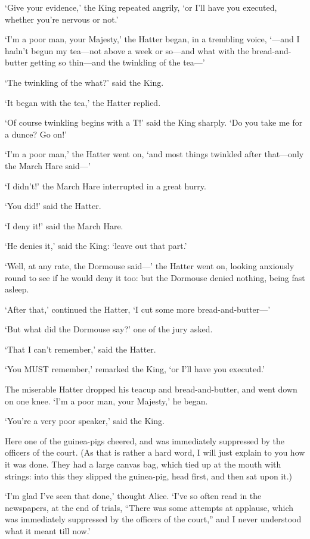 \documentclass[12pt]{book}
\begin{document}
\begin{Parallel}[p]{}{}
{‘Give your evidence,’ the King repeated angrily, ‘or I’ll have you executed, whether you’re nervous or not.’

‘I’m a poor man, your Majesty,’ the Hatter began, in a trembling voice, ‘—and I hadn’t begun my tea—not above a week or so—and what with the bread-and-butter getting so thin—and the twinkling of the tea—’

‘The twinkling of the what?’ said the King.

‘It began with the tea,’ the Hatter replied.

‘Of course twinkling begins with a T!’ said the King sharply. ‘Do you take me for a dunce? Go on!’

‘I’m a poor man,’ the Hatter went on, ‘and most things twinkled after that—only the March Hare said—’

‘I didn’t!’ the March Hare interrupted in a great hurry.

‘You did!’ said the Hatter.

‘I deny it!’ said the March Hare.

‘He denies it,’ said the King: ‘leave out that part.’

‘Well, at any rate, the Dormouse said—’ the Hatter went on, looking anxiously round to see if he would deny it too: but the Dormouse denied nothing, being fast asleep.

‘After that,’ continued the Hatter, ‘I cut some more bread-and-butter—’

‘But what did the Dormouse say?’ one of the jury asked.

‘That I can’t remember,’ said the Hatter.

‘You MUST remember,’ remarked the King, ‘or I’ll have you executed.’

The miserable Hatter dropped his teacup and bread-and-butter, and went down on one knee. ‘I’m a poor man, your Majesty,’ he began.

‘You’re a very poor speaker,’ said the King.

Here one of the guinea-pigs cheered, and was immediately suppressed by the officers of the court. (As that is rather a hard word, I will just explain to you how it was done. They had a large canvas bag, which tied up at the mouth with strings: into this they slipped the guinea-pig, head first, and then sat upon it.)

‘I’m glad I’ve seen that done,’ thought Alice. ‘I’ve so often read in the newspapers, at the end of trials, “There was some attempts at applause, which was immediately suppressed by the officers of the court,” and I never understood what it meant till now.’

}
\end{Parallel}
\end{document}
